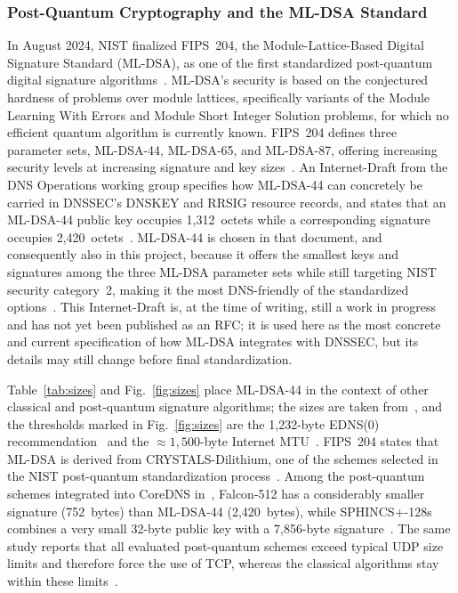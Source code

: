 \documentclass[conference]{IEEEtran}
\begin{document}
\subsubsection{Post-Quantum Cryptography and the ML-DSA Standard}
\label{sec:mldsa}

In August 2024, NIST finalized FIPS~204, the Module-Lattice-Based Digital
Signature Standard (ML-DSA), as one of the first standardized post-quantum
digital signature algorithms~\cite{fips204}. ML-DSA's security is based on the
conjectured hardness of problems over module lattices, specifically variants of
the Module Learning With Errors and Module Short Integer Solution problems, for
which no efficient quantum algorithm is currently known. FIPS~204 defines three
parameter sets, ML-DSA-44, ML-DSA-65, and ML-DSA-87, offering increasing
security levels at increasing signature and key sizes~\cite{fips204}. An
Internet-Draft from the DNS Operations working group specifies how ML-DSA-44 can concretely be carried in DNSSEC's DNSKEY and RRSIG
resource records, and states that an ML-DSA-44 public key occupies
1,312~octets while a corresponding signature occupies
2,420~octets~\cite{mldsadraft}. ML-DSA-44 is chosen in that document, and
consequently also in this project, because it offers the smallest keys and
signatures among the three ML-DSA parameter sets while still targeting NIST
security category~2, making it the most DNS-friendly of the standardized
options~\cite{mldsadraft}. This Internet-Draft is, at the time of writing,
still a work in progress and has not yet been published as an RFC; it is used
here as the most concrete and current specification of how ML-DSA integrates
with DNSSEC, but its details may still change before final standardization.

Table~\ref{tab:sizes} and Fig.~\ref{fig:sizes} place ML-DSA-44 in the context
of other classical and post-quantum signature algorithms; the sizes are taken
from~\cite{rfc6605,fips204,mldsadraft,cloudflareblog,corednspqc,rfc8080}, and
the thresholds marked in Fig.~\ref{fig:sizes} are the 1,232-byte EDNS(0)
recommendation~\cite{rfc9715} and the ${\approx}1{,}500$-byte Internet
MTU~\cite{cloudflaremtu}. FIPS~204 states that ML-DSA is derived from
CRYSTALS-Dilithium, one of the schemes selected in the NIST post-quantum
standardization process~\cite{fips204}. Among the post-quantum schemes
integrated into CoreDNS in~\cite{corednspqc}, Falcon-512 has a considerably
smaller signature (752~bytes) than ML-DSA-44 (2,420~bytes), while
SPHINCS+-128s combines a very small 32-byte public key with a 7,856-byte
signature~\cite{corednspqc}. The same study reports that all evaluated
post-quantum schemes exceed typical UDP size limits and therefore force the use
of TCP, whereas the classical algorithms stay within these
limits~\cite{corednspqc}.
\end{document}

